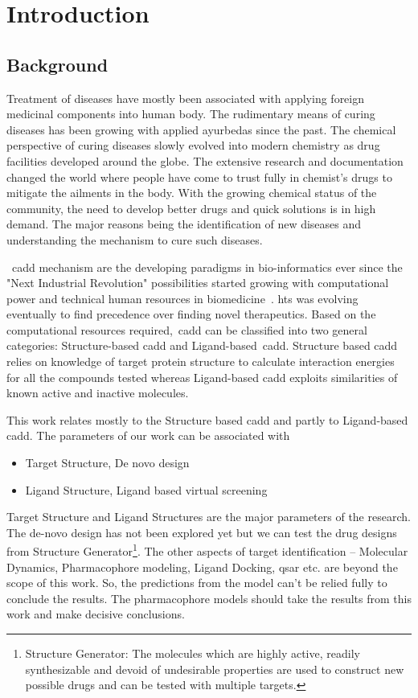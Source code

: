\setcounter{page}{1}
\chapter{Introduction}
\section{Background}
Treatment of diseases have mostly been associated with applying foreign medicinal components into human body. The rudimentary means of curing diseases has been growing with applied ayurbedas since the past. The chemical perspective of curing diseases slowly evolved into modern chemistry as drug facilities developed around the globe. The extensive research and documentation changed the world where people have come to trust fully in chemist's drugs to mitigate the ailments in the body. With the growing chemical status of the community, the need to develop better drugs and quick solutions is in high demand. The major reasons being the identification of new diseases and understanding the mechanism to cure such diseases.

~\acrfull{cadd} mechanism are the developing paradigms in bio-informatics ever since the "Next Industrial Revolution" possibilities started growing with computational power and technical human resources in biomedicine~\cite{Leelananda2016,Brown2017}. \acrfull{hts} was evolving eventually to find precedence over finding novel therapeutics. Based on the computational resources required,~\acrshort{cadd} can be classified into two general categories: Structure-based \acrshort{cadd} and Ligand-based~\acrshort{cadd}. Structure based \acrshort{cadd} relies on knowledge of target protein structure to calculate interaction energies for all the compounds tested whereas Ligand-based \acrshort{cadd} exploits similarities of known active and inactive molecules.

This work relates mostly to the Structure based \acrshort{cadd} and partly to Ligand-based \acrshort{cadd}. The parameters of our work can be associated with \begin{itemize}
    \setlength\parindent{24pt}
    \item Target Structure, De novo design 
    \item Ligand Structure, Ligand based virtual screening
\end{itemize}
Target Structure and Ligand Structures are the major parameters of the research. The de-novo design has not been explored yet but we can test the drug designs from Structure Generator\footnote{Structure Generator: The molecules which are highly active, readily synthesizable and devoid of undesirable properties are used to construct new possible drugs and can be tested with multiple targets.}. The other aspects of target identification -- Molecular Dynamics, Pharmacophore modeling, Ligand Docking, \acrfull{qsar} etc. are beyond the scope of this work. So, the predictions from the model can't be relied fully to conclude the results. The pharmacophore models should take the results from this work and make decisive conclusions. 

